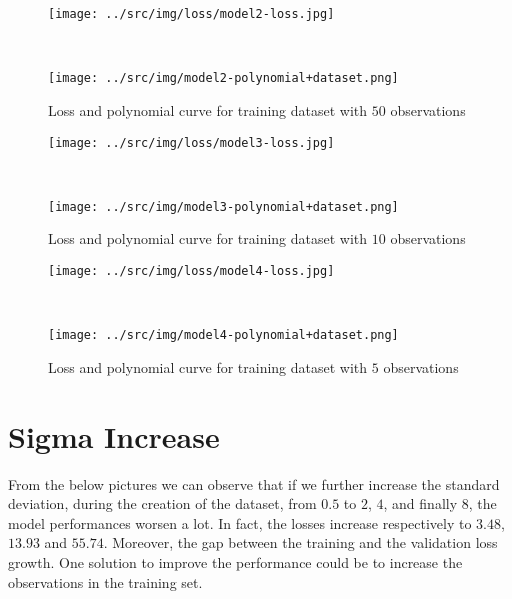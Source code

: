 \documentclass[a4paper,12pt]{article} %
\begin{document}
	\begin{figure}[H]
		\begin{minipage}[t]{.45\textwidth}
			\centering
			\texttt{[image: ../src/img/loss/model2-loss.jpg]}
		\end{minipage}
		~
		\begin{minipage}[t]{.45\textwidth}
			\centering
			\texttt{[image: ../src/img/model2-polynomial+dataset.png]}
		\end{minipage}
	\caption{Loss and polynomial curve for training dataset with $50$ 
	observations}
	\end{figure}
	
	\begin{figure}[H]
		\begin{minipage}[t]{.45\textwidth}
			\centering
			\texttt{[image: ../src/img/loss/model3-loss.jpg]}
		\end{minipage}
		~
		\begin{minipage}[t]{.45\textwidth}
			\centering
			\texttt{[image: ../src/img/model3-polynomial+dataset.png]}
		\end{minipage}
	\caption{Loss and polynomial curve for training dataset with $10$ 
		observations}
	\end{figure}
	
	\begin{figure}[H]
		\begin{minipage}[t]{.45\textwidth}
			\centering
			\texttt{[image: ../src/img/loss/model4-loss.jpg]}
		\end{minipage}
		~
		\begin{minipage}[t]{.45\textwidth}
			\centering
			\texttt{[image: ../src/img/model4-polynomial+dataset.png]}
		\end{minipage}
	\caption{Loss and polynomial curve for training dataset with $5$ 
	observations}
	\end{figure}
	
	\section{Sigma Increase}
	From the below pictures we can observe that if we further increase the  
	standard deviation, during the creation of the dataset, from $0.5$ to $2$, 
	$4$, and finally $8$, the model performances worsen a lot. In fact, the 
	losses increase respectively to $3.48$, $13.93$ and $55.74$. Moreover, the 
	gap between the training and the validation loss growth.
	One solution to improve the performance could be to increase the 
	observations in the training set.
	
\end{document}
